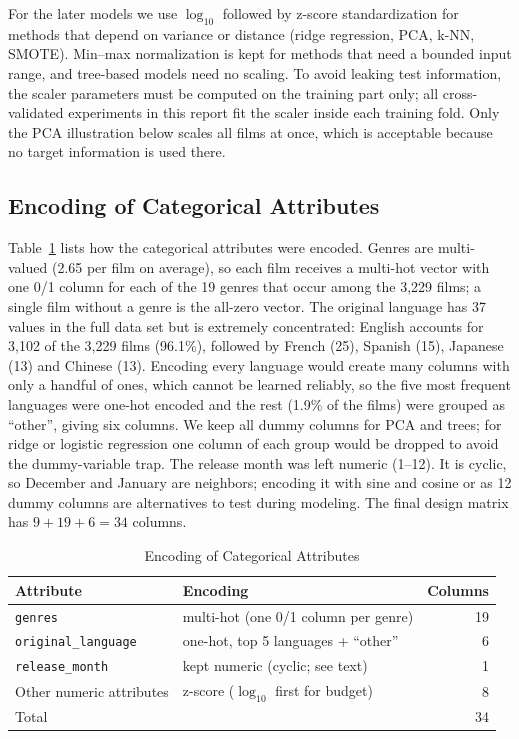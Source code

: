 \documentclass[conference]{IEEEtran}
\begin{document}
For the later models we use $\log_{10}$ followed by z-score standardization for methods that depend on variance
or distance (ridge regression, PCA, k-NN, SMOTE). Min--max normalization is kept for methods that need a
bounded input range, and tree-based models need no scaling. To avoid leaking test information, the scaler
parameters must be computed on the training part only; all cross-validated experiments in this report fit the scaler
inside each training fold. Only the PCA illustration below scales all films at once, which is acceptable
because no target information is used there.

\subsection{Encoding of Categorical Attributes}
Table~\ref{tab:p4_enc} lists how the categorical attributes were encoded. Genres are multi-valued
(2.65 per film on average), so each film receives a multi-hot vector with one 0/1 column for each of the
19 genres that occur among the 3,229 films; a single film without a genre is the all-zero vector.
The original language has 37 values in the full data set but is extremely concentrated: English accounts for
3,102 of the 3,229 films (96.1\%), followed by French (25), Spanish (15), Japanese (13) and Chinese (13).
Encoding every language would create many columns with only a handful of ones, which cannot be learned reliably,
so the five most frequent languages were one-hot encoded and the rest (1.9\% of the films) were grouped as
``other'', giving six columns. We keep all dummy columns for PCA and trees; for ridge or logistic
regression one column of each group would be dropped to avoid the dummy-variable trap. The release month was left
numeric (1--12). It is cyclic, so December and January are neighbors; encoding it with sine and cosine or as 12 dummy columns are alternatives
to test during modeling. The final design matrix has $9+19+6=34$ columns.

\begin{table}[t]
\caption{Encoding of Categorical Attributes}
\label{tab:p4_enc}
\centering
\scriptsize
\setlength{\tabcolsep}{3pt}
\begin{tabular}{p{}p{}r}
\toprule
Attribute & Encoding & Columns \\
\midrule
\texttt{genres} & multi-hot (one 0/1 column per genre) & 19 \\
\texttt{original\_language} & one-hot, top 5 languages + ``other'' & 6 \\
\texttt{release\_month} & kept numeric (cyclic; see text) & 1 \\
Other numeric attributes & z-score ($\log_{10}$ first for budget) & 8 \\
\midrule
Total & & 34 \\
\bottomrule
\end{tabular}
\end{table}
\end{document}
